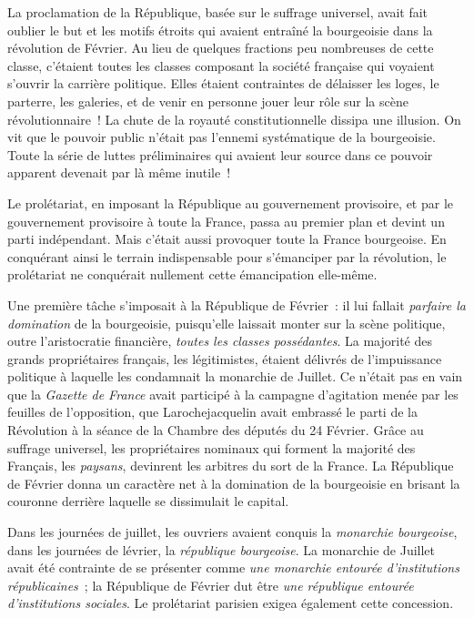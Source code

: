 \documentclass[french,twoside]{book} %
\begin{document}
\noindent La proclamation de la République, basée sur le suffrage universel, avait fait oublier le but et les motifs étroits qui avaient entraîné la bourgeoisie dans la révolution de Février. Au lieu de quelques fractions peu nombreuses de cette classe, c’étaient toutes les classes composant la société française qui voyaient s’ouvrir la carrière politique. Elles étaient contraintes de délaisser les loges, le parterre, les galeries, et de venir en personne jouer leur rôle sur la scène révolutionnaire ! La chute de la royauté constitutionnelle dissipa une illusion. On vit que le pouvoir public n’était pas l’ennemi systématique de la bourgeoisie. Toute la série de luttes préliminaires qui avaient leur source dans ce pouvoir apparent devenait par là même inutile !\par
Le prolétariat, en imposant la République au gouvernement provisoire, et par le gouvernement provisoire à toute la France, passa au premier plan et devint un parti indépendant. Mais c’était aussi provoquer toute la France bourgeoise. En conquérant ainsi le terrain indispensable pour s’émanciper par la révolution, le prolétariat ne conquérait nullement cette émancipation elle-même.\par
Une première tâche s’imposait à la République de Février : il lui fallait \emph{parfaire la domination} de la bourgeoisie, puisqu’elle laissait monter sur la scène politique, outre l’aristocratie financière, \emph{toutes les classes possédantes}. La majorité des grands propriétaires français, les légitimistes, étaient délivrés de l’impuissance politique à laquelle les condamnait la monarchie de Juillet. Ce n’était pas en vain que la \emph{Gazette de France} avait participé à la campagne d’agitation menée par les feuilles de l’opposition, que Larochejacquelin avait embrassé le parti de la Révolution à la séance de la Chambre des députés du 24 Février. Grâce au suffrage universel, les propriétaires nominaux qui forment la majorité des Français, les \emph{paysans}, devinrent les arbitres du sort de la France. La République de Février donna un caractère net à la domination de la bourgeoisie en brisant la couronne derrière laquelle se dissimulait le capital.\par
Dans les journées de juillet, les ouvriers avaient conquis la \emph{monarchie bourgeoise}, dans les journées de lévrier, la \emph{république bourgeoise}. La monarchie de Juillet avait été contrainte de se présenter comme \emph{une monarchie entourée d’institutions républicaines} ; la République de Février dut être \emph{une république entourée d’institutions sociales}. Le prolétariat parisien exigea également cette concession.\par
\end{document}
